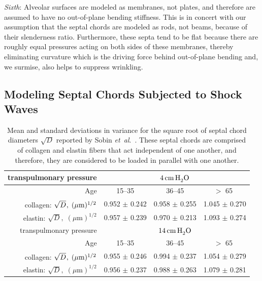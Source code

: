 \textit{Sixth\/}: Alveolar surfaces are modeled as membranes, not plates, and therefore are assumed to have no out-of-plane bending stiffness.  This is in concert with our assumption that the septal chords are modeled as rods, not beams, because of their slenderness ratio.  Furthermore, these septa tend to be flat because there are roughly equal pressures acting on both sides of these membranes, thereby eliminating curvature which is the driving force behind out-of-plane bending \cite{HoppinHildebrandt77} and, we surmise, also helps to suppress wrinkling.

\subsection{Modeling Septal Chords Subjected to Shock Waves}

\begin{table}
    \centering
    \begin{tabular}{|r|ccc|} 
        \hline 
        transpulmonary pressure &
        \multicolumn{3}{|c|}{$4 \, \mathrm{cm} \, \mathrm{H}_2^{\vphantom{|}} \mathrm{O}$} \\ 
        \hline
        Age & 15--35 & 36--45 & $>$ 65 $\vphantom{|}^{\vphantom{|}}$ \\ \hline 
        collagen: $\sqrt{D}^{\vphantom{|}}, \; ( \mu \textrm{m} )^{1/2}$ & 
        0.952 $\pm$ 0.242 & 0.958 $\pm$ 0.255 & 1.045 $\pm$ 0.270 \\
        elastin: $\sqrt{D}, \; ( \mu \textrm{m} )^{1/2}$ & 
        0.957 $\pm$ 0.239 & 0.970 $\pm$ 0.213 & 1.093 $\pm$ 0.274 \\
        \hline\hline       
        transpulmonary pressure &
        \multicolumn{3}{|c|}{$14 \, \mathrm{cm} \, \mathrm{H}_2^{\vphantom{|}} \mathrm{O}$} \\ 
        \hline
        Age & 15--35 & 36--45 & $>$ 65 $\vphantom{|}^{\vphantom{|}}$ \\ \hline 
        collagen: $\sqrt{D}^{\vphantom{|}}, \; ( \mu \textrm{m} )^{1/2}$ & 
        0.955 $\pm$ 0.246 & 0.994 $\pm$ 0.237 & 1.054 $\pm$ 0.279 \\
        elastin: $\sqrt{D}, \; ( \mu \textrm{m} )^{1/2}$ & 
        0.956 $\pm$ 0.237 & 0.988 $\pm$ 0.263 & 1.079 $\pm$ 0.281 \\
        \hline
    \end{tabular}
    \caption{\label{tab:alveolarProp}
        Mean and standard deviations in variance for the square root of septal chord diameters $\sqrt{D}$ reported by Sobin \textit{et~al}.\ \cite{Sobinetal88}.  These septal chords are comprised of collagen and elastin fibers that act independent of one another, and therefore, they are considered to be loaded in parallel with one another.}
\end{table}

